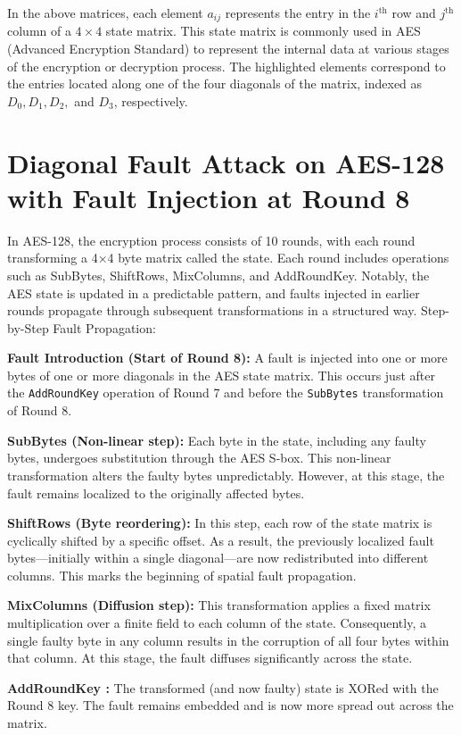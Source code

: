 In the above matrices, each element \(a_{ij}\) represents the entry in the \(i^{\text{th}}\) row and \(j^{\text{th}}\) column of a \(4 \times 4\) state matrix. This state matrix is commonly used in AES (Advanced Encryption Standard) to represent the internal data at various stages of the encryption or decryption process. The highlighted elements correspond to the entries located along one of the four diagonals of the matrix, indexed as \(D_0, D_1, D_2,\) and \(D_3\), respectively.

\section{Diagonal Fault Attack on AES-128 with Fault Injection at Round 8}
In AES-128, the encryption process consists of 10 rounds, with each round transforming a 4×4 byte matrix called the state. Each round includes operations such as SubBytes, ShiftRows, MixColumns, and AddRoundKey. Notably, the AES state is updated in a predictable pattern, and faults injected in earlier rounds propagate through subsequent transformations in a structured way.
Step-by-Step Fault Propagation:

\textbf{Fault Introduction (Start of Round 8):}
A fault is injected into one or more bytes of one or more diagonals in the AES state matrix. This occurs just after the \texttt{AddRoundKey} operation of Round 7 and before the \texttt{SubBytes} transformation of Round 8.

\textbf{SubBytes (Non-linear step):}
Each byte in the state, including any faulty bytes, undergoes substitution through the AES S-box. This non-linear transformation alters the faulty bytes unpredictably. However, at this stage, the fault remains localized to the originally affected bytes.

\textbf{ShiftRows (Byte reordering):}
In this step, each row of the state matrix is cyclically shifted by a specific offset. As a result, the previously localized fault bytes—initially within a single diagonal—are now redistributed into different columns. This marks the beginning of spatial fault propagation.

\textbf{MixColumns (Diffusion step):}
This transformation applies a fixed matrix multiplication over a finite field to each column of the state. Consequently, a single faulty byte in any column results in the corruption of all four bytes within that column. At this stage, the fault diffuses significantly across the state.

\textbf{AddRoundKey :}
The transformed (and now faulty) state is XORed with the Round 8 key. The fault remains embedded and is now more spread out across the matrix.

